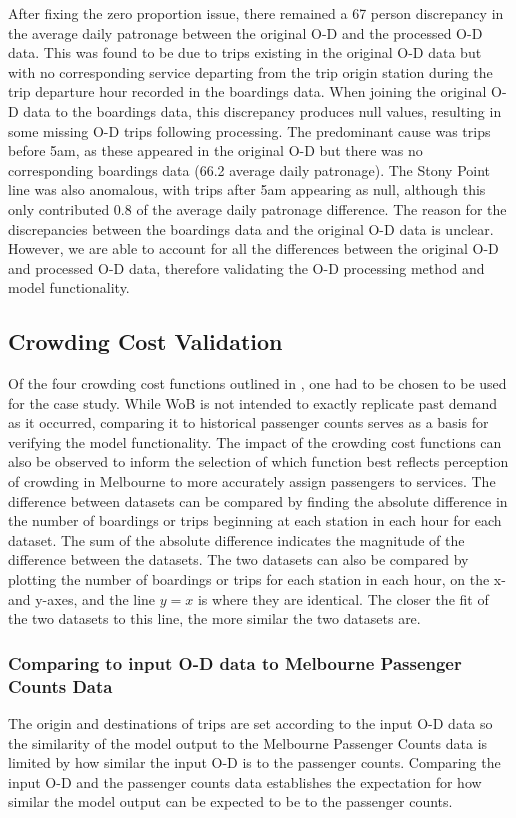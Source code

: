 After fixing the zero proportion issue, there remained a 67 person discrepancy in the average daily patronage between the original O-D and the processed O-D data. This was found to be due to trips existing in the original O-D data but with no corresponding service departing from the trip origin station during the trip departure hour recorded in the boardings data. When joining the original O-D data to the boardings data, this discrepancy produces null values, resulting in some missing O-D trips following processing. The predominant cause was trips before 5am, as these appeared in the original O-D but there was no corresponding boardings data (66.2 average daily patronage). The Stony Point line was also anomalous, with trips after 5am appearing as null, although this only contributed 0.8 of the average daily patronage difference. The reason for the discrepancies between the boardings data and the original O-D data is unclear. However, we are able to account for all the differences between the original O-D and processed O-D data, therefore validating the O-D processing method and model functionality.

\subsection{Crowding Cost Validation}
\label{subsec:validation_crowding}
Of the four crowding cost functions outlined in , one had to be chosen to be used for the case study. While WoB is not intended to exactly replicate past demand as it occurred, comparing it to historical passenger counts serves as a basis for verifying the model functionality. The impact of the crowding cost functions can also be observed to inform the selection of which function best reflects perception of crowding in Melbourne to more accurately assign passengers to services. The difference between datasets can be compared by finding the absolute difference in the number of boardings or trips beginning at each station in each hour for each dataset. The sum of the absolute difference indicates the magnitude of the difference between the datasets. The two datasets can also be compared by plotting the number of boardings or trips for each station in each hour, on the x- and y-axes, and the line $y=x$ is where they are identical. The closer the fit of the two datasets to this line, the more similar the two datasets are. 

\subsubsection{Comparing to input O-D data to Melbourne Passenger Counts Data}
The origin and destinations of trips are set according to the input O-D data so the similarity of the model output to the Melbourne Passenger Counts data is limited by how similar the input O-D is to the passenger counts. Comparing the input O-D and the passenger counts data establishes the expectation for how similar the model output can be expected to be to the passenger counts. 

